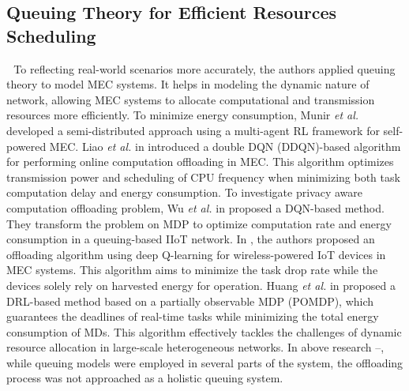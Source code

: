 \documentclass[12pt,draftclsnofoot,onecolumn]{IEEEtran}
\newenvironment{my}[2]%
{\begin{list}{}%
{\setlength{\rightmargin}{#1}\setlength{\leftmargin}{#2}}%


 \item[]{}

} {\end{list}}
\begin{document}
\begin{enumerate}
\begin{my}{1cm}{1cm}
{\subsection{Queuing Theory for Efficient Resources Scheduling}
\,\,\,\,To reflecting real-world scenarios more accurately, the authors applied queuing theory to model MEC systems. It helps in modeling the dynamic nature of network, allowing MEC systems to allocate computational and transmission resources more efficiently.
To minimize energy consumption, Munir \textit{et al.} \cite{munir2021multi} developed a semi-distributed approach using a multi-agent RL framework for self-powered MEC. 
Liao \textit{et al.} in \cite{liao2023online} introduced a double DQN (DDQN)-based algorithm for performing online computation offloading in MEC. This algorithm optimizes transmission power and scheduling of CPU frequency when minimizing both task computation delay and energy consumption. 
To investigate privacy aware computation offloading problem, Wu \textit{et al.} in \cite{wu2024combining} proposed a DQN-based method. They transform the problem on MDP to optimize computation rate and energy consumption in a queuing-based IIoT network.
In \cite{Bolourian-WCL24}, the authors proposed an offloading algorithm using deep Q-learning for wireless-powered IoT devices in MEC systems. This algorithm aims to minimize the task drop rate while the devices solely rely on harvested energy for operation. 
Huang \textit{et al.} in \cite{huang2021deadline} proposed a DRL-based method based on a partially observable MDP (POMDP), which guarantees the deadlines of real-time tasks while minimizing the total energy consumption of MDs. This algorithm effectively tackles the challenges of dynamic resource allocation in large-scale heterogeneous networks.
In above research \cite{munir2021multi}--\cite{huang2021deadline}, while queuing models were employed in several parts of the system, the offloading process was not approached as a holistic queuing system. 
}
\end{my}
\end{enumerate}
\end{document}
